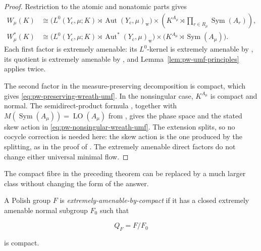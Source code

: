 \begin{proof}
Restriction to the atomic and nonatomic parts gives
\begin{align*}
 W_\mu(K)
 &\cong
 \bigl(L^0(Y_{\mathrm c},\mu;K)\rtimes
       \operatorname{Aut}(Y_{\mathrm c},\mu)_{\mathrm w}\bigr)
 \times
 \left(K^{A_\mu}\rtimes
       \prod_{r\in R_\mu}\operatorname{Sym}(A_r)\right),\\
 W_\mu^*(K)
 &\cong
 \bigl(L^0(Y_{\mathrm c},\mu;K)\rtimes
       \operatorname{Aut}^*(Y_{\mathrm c},\mu)_{\mathrm w}\bigr)
 \times
 \bigl(K^{A_\mu}\rtimes\operatorname{Sym}(A_\mu)\bigr).
\end{align*}
Each first factor is extremely amenable: its \(L^0\)-kernel is extremely
amenable by \cite[Theorem~1.1]{PestovSchneider2017}, its quotient is extremely amenable by
\cite[Theorem~4.2 and Theorem~6.1]{GiordanoPestov2007}, and
Lemma~\ref{lem:pw-umf-principles} applies twice.

The second factor in the measure-preserving decomposition is compact, which
gives \eqref{eq:pw-preserving-wreath-umf}. In the nonsingular case,
\(K^{A_\mu}\) is compact and normal. The semidirect-product formula
\cite[Proposition~6.1]{KechrisSokic2012}, together with
\(M(\operatorname{Sym}(A_\mu))=\operatorname{LO}(A_\mu)\) from \cite{GlasnerWeiss2002},
gives the phase space and the stated skew action in
\eqref{eq:pw-nonsingular-wreath-umf}. The extension splits, so no cocycle
correction is needed here: the skew action is the one produced by the
splitting, as in the proof of \cite[Proposition~6.1]{KechrisSokic2012}. The extremely amenable direct factors do
not change either universal minimal flow.
\end{proof}

The compact fibre in the preceding theorem can be replaced by a much larger
class without changing the form of the answer.

\begin{definition}\label{def:pw-ea-by-compact}
A Polish group \(F\) is \emph{extremely-amenable-by-compact} if it has a closed
extremely amenable normal subgroup \(F_0\) such that

\[
 Q_F=F/F_0
\]

is compact.
\end{definition}

